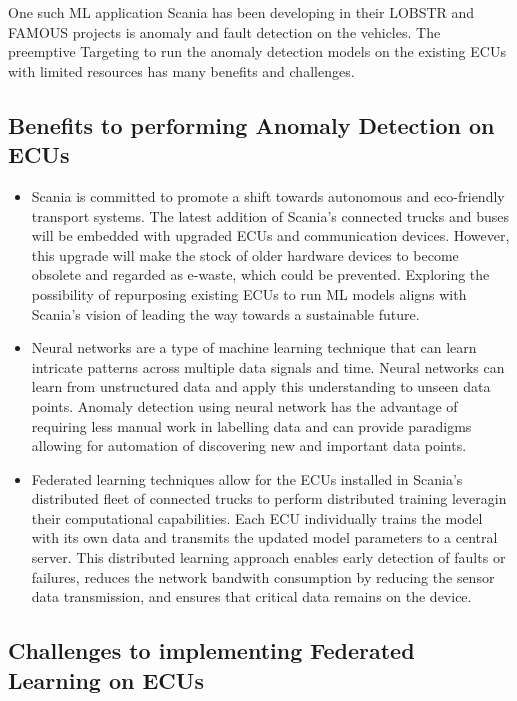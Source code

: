 One such ML application Scania has been developing in their \textsc{LOBSTR} \cite{lobstr} and \textsc{FAMOUS} \cite{famous} projects is anomaly and fault detection on the vehicles. The preemptive Targeting to run the anomaly detection models on the existing ECUs with limited resources has many benefits and challenges.

\subsection*{Benefits to performing Anomaly Detection on ECUs}

\begin{itemize}
	\item Scania is committed to promote a shift towards autonomous and eco-friendly transport systems. The latest addition of Scania's connected trucks and buses will be embedded with upgraded ECUs and communication devices. However, this upgrade will make the stock of older hardware devices to become obsolete and regarded as e-waste, which could be prevented. Exploring the possibility of repurposing existing ECUs to run ML models aligns with Scania's vision of leading the way towards a sustainable future.
	\item Neural networks are a type of machine learning technique that can learn intricate patterns across multiple data signals and time. Neural networks can learn from unstructured data and apply this understanding to unseen data points. Anomaly detection using neural network has the advantage of requiring less manual work in labelling data and can provide paradigms allowing for automation of discovering new and important data points.
	\item Federated learning techniques allow for the ECUs installed in Scania's distributed fleet of connected trucks to perform distributed training leveragin their computational capabilities. Each ECU individually trains the model with its own data and transmits the updated model parameters to a central server. This distributed learning approach enables early detection of faults or failures, reduces the network bandwith consumption by reducing the sensor data transmission, and ensures that critical data remains on the device.
\end{itemize}

\subsection*{Challenges to implementing Federated Learning on ECUs}

